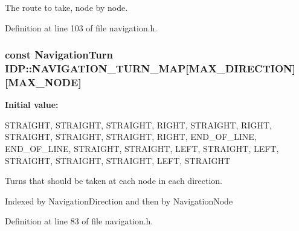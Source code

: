 The route to take, node by node. 



Definition at line 103 of file navigation.h.

\hypertarget{namespaceIDP_a0bada0608b684564e235786b3b38c10a}{
\subsubsection[{NAVIGATION\_\-TURN\_\-MAP}]{\setlength{\rightskip}{0pt plus 5cm}const {\bf NavigationTurn} {\bf IDP::NAVIGATION\_\-TURN\_\-MAP}\mbox{[}MAX\_\-DIRECTION\mbox{]}\mbox{[}MAX\_\-NODE\mbox{]}}}
\label{namespaceIDP_a0bada0608b684564e235786b3b38c10a}
{\bfseries Initial value:}
\begin{DoxyCode}
 {
        {STRAIGHT, STRAIGHT, STRAIGHT, RIGHT, STRAIGHT, RIGHT, STRAIGHT,
            STRAIGHT, STRAIGHT, RIGHT, END_OF_LINE},
        {END_OF_LINE, STRAIGHT, STRAIGHT, LEFT, STRAIGHT, LEFT, STRAIGHT,
            STRAIGHT, STRAIGHT, LEFT, STRAIGHT}
    }
\end{DoxyCode}


Turns that should be taken at each node in each direction. 

Indexed by NavigationDirection and then by NavigationNode 

Definition at line 83 of file navigation.h.


